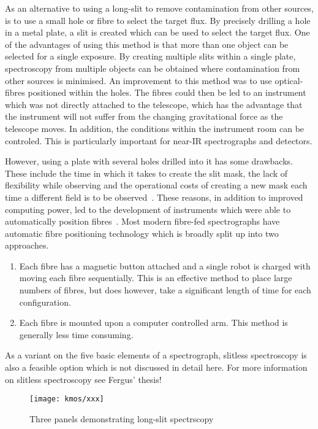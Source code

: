 As an alternative to using a long-slit to remove contamination from other sources, is to use a small hole or fibre to select the target flux.
By precisely drilling a hole in a metal plate, a slit is created which can be used to select the target flux.
One of the advantages of using this method is that more than one object can be selected for a single exposure.
By creating multiple slits within a single plate, spectroscopy from multiple objects can be obtained where contamination from other sources is minimised.
An improvement to this method was to use optical-fibres positioned within the holes.
The fibres could then be led to an instrument which was not directly attached to the telescope, which has the advantage that the instrument will not suffer from the changing gravitational force as the telescope moves.
In addition, the conditions within the instrument room can be controled.
This is particularly important for near-IR spectrographs and detectors.

However, using a plate with several holes drilled into it has some drawbacks.
These include the time in which it takes to create the slit mask, the lack of flexibility while observing and the operational costs of creating a new mask each time a different field is to be observed~\citep{1986SPIE..627..118P}.
These reasons, in addition to improved computing power, led to the development of instruments which were able to automatically position fibres~\citep{1982SPIE..331..289T}.
Most modern fibre-fed spectrographs have automatic fibre positioning technology which is broadly split up into two approaches.

\begin{enumerate}
    \item Each fibre has a magnetic button attached and a single robot is charged with moving each fibre sequentially.
    This is an effective method to place large numbers of fibres, but does however, take a significant length of time for each configuration.
    \item Each fibre is mounted upon a computer controlled arm.
    This method is generally less time consuming.
\end{enumerate}

As a variant on the five basic elements of a spectrograph, slitless spectroscopy is also a feasible option which is not discussed in detail here.
For more information on slitless spectroscopy see Fergus' thesis!

\begin{figure}
 \centering
 \texttt{[image: kmos/xxx]}
 \caption[Long-slit Spectrscopy]{Three panels demonstrating long-slit spectrscopy
 \label{fig:long-slit}}
\end{figure}


